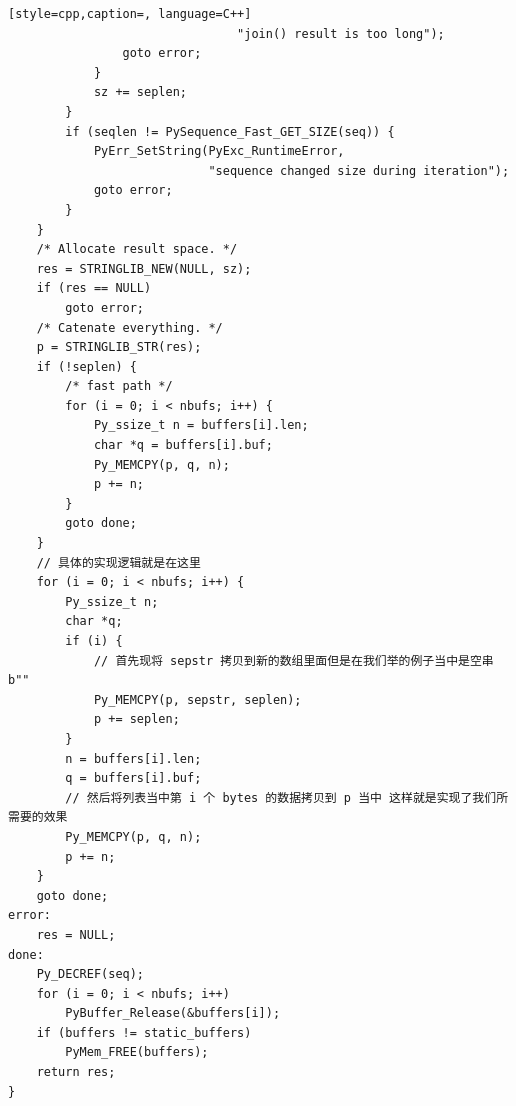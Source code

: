 \begin{lstlisting}[style=cpp,caption=, language=C++]
                                "join() result is too long");
                goto error;
            }
            sz += seplen;
        }
        if (seqlen != PySequence_Fast_GET_SIZE(seq)) {
            PyErr_SetString(PyExc_RuntimeError,
                            "sequence changed size during iteration");
            goto error;
        }
    }
    /* Allocate result space. */
    res = STRINGLIB_NEW(NULL, sz);
    if (res == NULL)
        goto error;
    /* Catenate everything. */
    p = STRINGLIB_STR(res);
    if (!seplen) {
        /* fast path */
        for (i = 0; i < nbufs; i++) {
            Py_ssize_t n = buffers[i].len;
            char *q = buffers[i].buf;
            Py_MEMCPY(p, q, n);
            p += n;
        }
        goto done;
    }
    // 具体的实现逻辑就是在这里
    for (i = 0; i < nbufs; i++) {
        Py_ssize_t n;
        char *q;
        if (i) {
            // 首先现将 sepstr 拷贝到新的数组里面但是在我们举的例子当中是空串 b""
            Py_MEMCPY(p, sepstr, seplen);
            p += seplen;
        }
        n = buffers[i].len;
        q = buffers[i].buf;
        // 然后将列表当中第 i 个 bytes 的数据拷贝到 p 当中 这样就是实现了我们所需要的效果
        Py_MEMCPY(p, q, n);
        p += n;
    }
    goto done;
error:
    res = NULL;
done:
    Py_DECREF(seq);
    for (i = 0; i < nbufs; i++)
        PyBuffer_Release(&buffers[i]);
    if (buffers != static_buffers)
        PyMem_FREE(buffers);
    return res;
}
\end{lstlisting}
